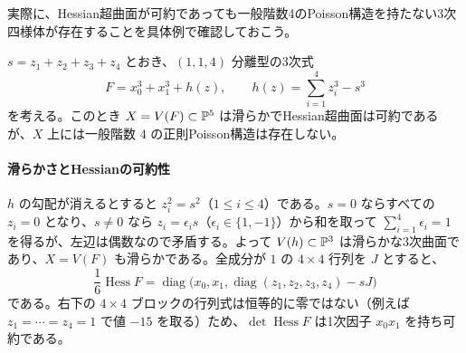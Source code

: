 実際に、Hessian超曲面が可約であっても一般階数4のPoisson構造を持たない3次四様体が存在することを具体例で確認しておこう。

\begin{example}
\label{ex:pg-reducible-hessian-no-rank-four}
$s=z_1+z_2+z_3+z_4$ とおき、$(1,1,4)$ 分離型の3次式
\begin{equation}\label{eq:pg-hessian-counterexample-cubic}
F=x_0^3+x_1^3+h(z),\qquad
h(z)=\sum_{i=1}^4z_i^3-s^3
\end{equation}
を考える。このとき $X=V(F)\subset\mathbb P^5$ は滑らかでHessian超曲面は可約であるが、$X$ 上には一般階数 $4$ の正則Poisson構造は存在しない。

\paragraph{滑らかさとHessianの可約性}
$h$ の勾配が消えるとすると $z_i^2=s^2$（$1\le i\le4$）である。$s=0$ ならすべての $z_i=0$ となり、$s\ne0$ なら $z_i=\epsilon_i s$（$\epsilon_i\in\{1,-1\}$）から和を取って $\sum_{i=1}^4\epsilon_i=1$ を得るが、左辺は偶数なので矛盾する。よって $V(h)\subset\mathbb P^3$ は滑らかな3次曲面であり、$X=V(F)$ も滑らかである。全成分が $1$ の $4\times4$ 行列を $J$ とすると、
\begin{equation}\label{eq:pg-hessian-counterexample-matrix}
\frac16\operatorname{Hess}F
=\operatorname{diag}\bigl(x_0,x_1,
        \operatorname{diag}(z_1,z_2,z_3,z_4)-sJ\bigr)
\end{equation}
である。右下の $4\times4$ ブロックの行列式は恒等的に零ではない（例えば $z_1=\cdots=z_4=1$ で値 $-15$ を取る）ため、$\det\operatorname{Hess}F$ は1次因子 $x_0 x_1$ を持ち可約である。


\end{example}
